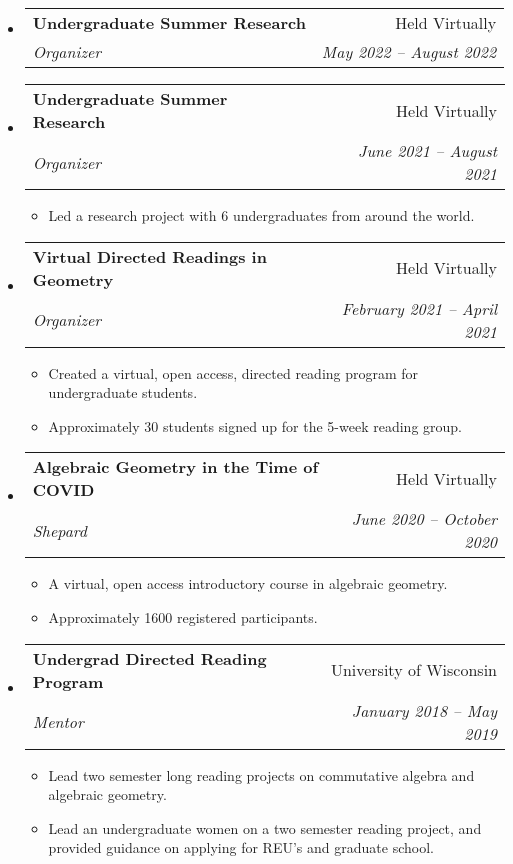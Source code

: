 \documentclass[letterpaper,11pt]{article}
\makeatletter
\newcommand{\resitem}[1]{\item #1 \vspace{-2pt}}
\newcommand{\ressubheading}[4]{
\begin{tabular*}{6.5in}[t]{l@{\cftdotfill{\cftsecdotsep}\extracolsep{\fill}}r}
		\textbf{#1} & #2 \\
		\textit{#3} & \textit{#4} \\
\end{tabular*}\vspace{-6pt}}
\makeatother
\begin{document}
\begin{itemize}

%
%
\item 
	\ressubheading{Undergraduate Summer Research}{Held Virtually}{Organizer}{May 2022 -- August 2022}

	
\item 
	\ressubheading{Undergraduate Summer Research}{Held Virtually}{Organizer}{June 2021 -- August 2021}
	\begin{itemize}
		\resitem{Led a research project with 6 undergraduates from around the world.}
	\end{itemize}
	
\item 
	\ressubheading{Virtual Directed Readings in Geometry}{Held Virtually}{Organizer}{February 2021 -- April 2021}
	\begin{itemize}
		\resitem{Created a virtual, open access, directed reading program for undergraduate students.}
		\resitem{Approximately 30 students signed up for the 5-week reading group.}
	\end{itemize}

\item 
	\ressubheading{Algebraic Geometry in the Time of COVID}{Held Virtually}{Shepard}{June 2020 -- October 2020}
	\begin{itemize}
		\resitem{A virtual, open access introductory course in algebraic geometry.}
		\resitem{Approximately 1600 registered participants.}
	\end{itemize}
		
%
%
%	
\item 
	\ressubheading{Undergrad Directed Reading Program}{University of Wisconsin}{Mentor}{January 2018 -- May 2019}
	\begin{itemize}
		\resitem{Lead two semester long reading projects on commutative algebra and algebraic geometry.}
		\resitem{Lead an undergraduate women on a two semester reading project, and provided guidance on applying for REU's and graduate school.}
	\end{itemize}
	

\end{itemize}
\end{document}
